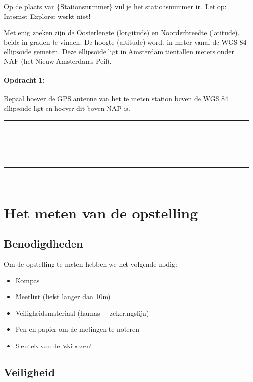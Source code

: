 Op de plaats van \{Stationsnummer\} vul je het stationsnummer in. Let
op: Internet Explorer werkt niet! 

Met enig zoeken zijn de Oosterlengte (longitude) en Noorderbreedte
(latitude), beide in graden te vinden. De hoogte (altitude) wordt in
meter vanaf de WGS 84 ellipsoïde gemeten. Deze ellipsoïde ligt in
Amsterdam tientallen meters onder NAP (het Nieuw Amsterdams Peil).

\begin{minipage}[t]{1\columnwidth}%

\paragraph{Opdracht 1:}

Bepaal hoever de GPS antenne van het te meten station boven
        de WGS 84 ellipsoïde ligt en hoever dit boven NAP is.

\begin{center}
    \rule{\textwidth}{0.3mm}\\
    \rule{\textwidth}{0.3mm}\\
    \rule{\textwidth}{0.3mm}\\
\end{center}
\end{minipage}


\section{Het meten van de opstelling}


\subsection{Benodigdheden}

Om de opstelling te meten hebben we het volgende nodig:

\begin{itemize}
    \item Kompas
    \item Meetlint (liefst langer dan 10m)
    \item Veiligheidsmateriaal (harnas + zekeringslijn)
    \item Pen en papier om de metingen te noteren
    \item Sleutels van de `skiboxen'
\end{itemize}

\subsection{Veiligheid}

